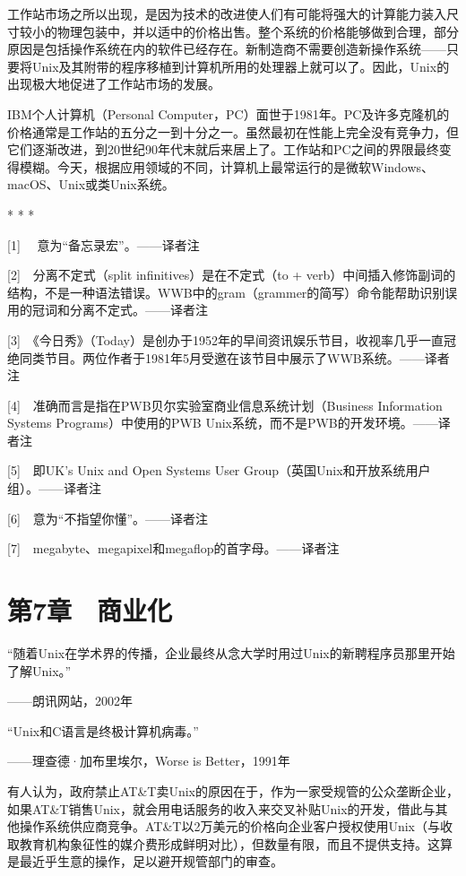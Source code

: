 \documentclass[a4paper,12pt,UTF8,twoside]{ctexbook}
\begin{document}
工作站市场之所以出现，是因为技术的改进使人们有可能将强大的计算能力装入尺寸较小的物理包装中，并以适中的价格出售。整个系统的价格能够做到合理，部分原因是包括操作系统在内的软件已经存在。新制造商不需要创造新操作系统——只要将Unix及其附带的程序移植到计算机所用的处理器上就可以了。因此，Unix的出现极大地促进了工作站市场的发展。

IBM个人计算机（Personal Computer，PC）面世于1981年。PC及许多克隆机的价格通常是工作站的五分之一到十分之一。虽然最初在性能上完全没有竞争力，但它们逐渐改进，到20世纪90年代末就后来居上了。工作站和PC之间的界限最终变得模糊。今天，根据应用领域的不同，计算机上最常运行的是微软Windows、macOS、Unix或类Unix系统。



* * *



[1]　 意为“备忘录宏”。——译者注

[2]　分离不定式（split infinitives）是在不定式（to + verb）中间插入修饰副词的结构，不是一种语法错误。WWB中的gram（grammer的简写）命令能帮助识别误用的冠词和分离不定式。——译者注

[3]　《今日秀》（Today）是创办于1952年的早间资讯娱乐节目，收视率几乎一直冠绝同类节目。两位作者于1981年5月受邀在该节目中展示了WWB系统。——译者注

[4]　准确而言是指在PWB贝尔实验室商业信息系统计划（Business Information Systems Programs）中使用的PWB Unix系统，而不是PWB的开发环境。——译者注

[5]　即UK’s Unix and Open Systems User Group（英国Unix和开放系统用户组）。——译者注

[6]　意为“不指望你懂”。——译者注

[7]　megabyte、megapixel和megaflop的首字母。——译者注





\chapter{第7章　商业化}


“随着Unix在学术界的传播，企业最终从念大学时用过Unix的新聘程序员那里开始了解Unix。”

——朗讯网站，2002年

“Unix和C语言是终极计算机病毒。”

——理查德·加布里埃尔，Worse is Better，1991年

有人认为，政府禁止AT\&T卖Unix的原因在于，作为一家受规管的公众垄断企业，如果AT\&T销售Unix，就会用电话服务的收入来交叉补贴Unix的开发，借此与其他操作系统供应商竞争。AT\&T以2万美元的价格向企业客户授权使用Unix（与收取教育机构象征性的媒介费形成鲜明对比），但数量有限，而且不提供支持。这算是最近乎生意的操作，足以避开规管部门的审查。
\end{document}
